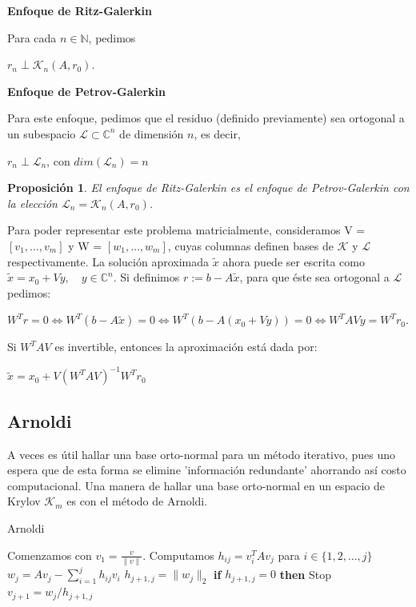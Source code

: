 \documentclass[12pt, oneside]{book}
\begin{document}
\begin{flushleft}
	\textbf{Enfoque de Ritz-Galerkin}
\end{flushleft}
Para cada $n \in \mathbb{N}$, pedimos
\begin{center}
	$r_n \perp \mathcal{K}_{n}(A, r_0).$
\end{center}
\begin{flushleft}
	\textbf{Enfoque de Petrov-Galerkin}
\end{flushleft}
Para este enfoque, pedimos que el residuo (definido previamente) sea ortogonal a un subespacio $\mathcal{L} \subset \mathbb{C}^{n}$ de dimensión $n$, es decir,
\begin{center}
	$r_n \perp \mathcal{L}_n$, con $dim(\mathcal{L}_n) = n$
\end{center}
\newtheorem{proposicion}{Proposición}
\begin{proposicion}
	El enfoque de Ritz-Galerkin es el enfoque de Petrov-Galerkin con la elección $\mathcal{L}_n = \mathcal{K}_{n}(A, r_0)$.
\end{proposicion}
Para poder representar este problema matricialmente, consideramos V = $[v_1, \ldots, v_m]$ y W = $[w_1, \ldots, w_m]$, cuyas columnas definen bases de $\mathcal{K}$ y $\mathcal{L}$ respectivamente. La solución aproximada $\tilde{x}$ ahora puede ser escrita como $\tilde{x} = x_0 + Vy, \quad y \in \mathbb{C}^n$. Si definimos $r := b - A\tilde{x}$, para que éste sea ortogonal a $\mathcal{L}$ pedimos:
\begin{center}
	$W^Tr = 0 \iff W^T(b - A\tilde{x}) = 0 \iff W^T(b - A(x_0 + Vy)) = 0 \iff \boxed{W^TAVy = W^Tr_0}$.
\end{center}
Si $W^TAV$ es invertible, entonces la aproximación está dada por:
\begin{center}
	$\tilde{x} = x_0 + V(W^TAV)^{-1}W^Tr_0$
\end{center}

\subsection{Arnoldi}

A veces es útil hallar una base orto-normal para un método iterativo, pues uno espera que de esta forma se elimine 'información redundante' ahorrando así costo computacional. Una manera de hallar una base orto-normal en un espacio de Krylov $\mathcal{K}_m$ es con el método de Arnoldi.
	
	\begin{algorithm}
		\caption{Arnoldi}
		\begin{algorithmic}[1]
			\STATE Comenzamos con $v_1 = \frac{v}{\|v\|}$.
				\STATE Computamos $h_{ij} = v_i^TAv_j$ para $i \in \{1, 2, \dots, j\}$
				\STATE $w_j = Av_j - \sum_{i=1}^j h_{ij} v_i$
				\STATE $h_{j+1,j} = \|w_j\|_2$
				\STATE \textbf{if} $h_{j+1,j} = 0$ \textbf{then} Stop
			\ENDFOR
			\STATE $v_{j+1} = w_j / h_{j+1,j}$
		
		\end{algorithmic}
	\end{algorithm}
	
\end{document}
